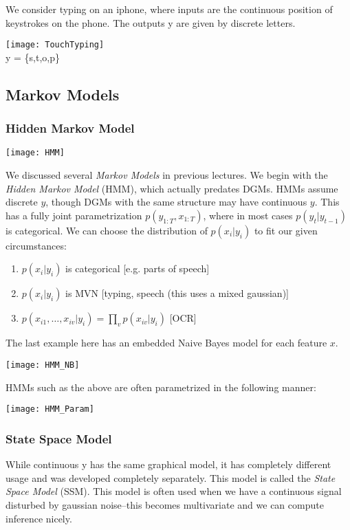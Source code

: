 \documentclass{article}
\begin{document}
\begin{example}
We consider typing on an iphone, where inputs are the continuous position of keystrokes on the phone. The outputs y are given by discrete letters.
\begin{center}
\texttt{[image: TouchTyping]} \\
y = \{s,t,o,p\}
\end{center}
\end{example}
\subsection{Markov Models}
\subsubsection{Hidden Markov Model}
\begin{center}
\texttt{[image: HMM]} 
\end{center}
We discussed several \textit{Markov Models} in previous lectures. We begin with the \textit{Hidden Markov Model} (HMM), which actually predates DGMs. HMMs assume discrete $y$, though DGMs with the same structure may have continuous $y$. This has a fully joint parametrization $p(y_{1:T},x_{1:T})$, where in most cases $p(y_t | y_{t-1})$ is categorical. We can choose the distribution of $p(x_i|y_i)$ to fit our given circumstances:
\begin{enumerate}
\item $p(x_i|y_i)$ is categorical [e.g. parts of speech]
\item $p(x_i|y_i)$ is MVN [typing, speech (this uses a mixed gaussian)]
\item $p(x_{i1},\ldots,x_{iv}|y_i) = \prod\limits_v p(x_{iv} | y_i)$ [OCR]
\end{enumerate}
The last example here has an embedded Naive Bayes model for each feature $x$. 
\begin{center}
\texttt{[image: HMM\_NB]} 
\end{center}
HMMs such as the above are often parametrized in the following manner:
\begin{center}
\texttt{[image: HMM\_Param]} 
\end{center}
\subsubsection{State Space Model}
While continuous y has the same graphical model, it has completely different usage and was developed completely separately. This model is called the \textit{State Space Model} (SSM). This model is often used when we have a continuous signal disturbed by gaussian noise--this becomes multivariate and we can compute inference nicely. 
\end{document}
